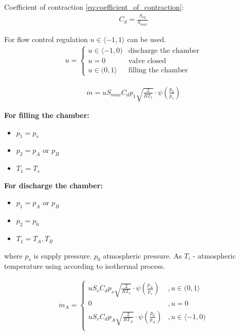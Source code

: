 \documentclass[class=article, crop=false]{standalone}
\begin{document}
Coefficient of contraction \ref{eq:coefficient_of_contraction}:
\begin{align}
    C_d = \frac{S_{eq}}{S_{max}}
    \label{eq:coefficient_of_contraction}
\end{align}

For flow control regulation $u \in \langle-1,1\rangle$ can be used.
\begin{align}
    u =
    \begin{cases}
        u \in \langle -1, 0) & \text{discharge the chamber} \\
        u = 0& \text{valve closed}  \\
        u \in (0, 1\rangle & \text{filling the chamber} 
    \end{cases}
\end{align} 

\begin{align}
    \dot{m} = u S_{max} C_d p_1 \sqrt{\frac{2}{RT_1}}
    \cdot \psi\left(\frac{p_2}{p_1}\right)
    \label{eq:flow}
\end{align}

\textbf{For filling the chamber:}
\begin{itemize}
\item $p_1 = p_s$ 
\item $p_2 = p_A \text{ or } p_B$
\item $T_1 = T_s$
\end{itemize}

\textbf{For discharge the chamber:}
\begin{itemize}
\item $p_1 = p_A \text{ or } p_B$
\item $p_2 = p_0$
\item $T_1 = T_A, T_B$
\end{itemize}

where $p_s$ is supply pressure. $p_0$ atmospheric pressure. As $T_i$ - 
atmospheric temperature using according to isothermal process.

\begin{align}
    \dot{m}_A =
    \begin{cases}
        u S_v C_d p_s \sqrt{\frac{2}{RT_s}}
        \cdot \psi\left(\frac{p_A}{p_s}\right)  &,   u \in (0, 1 \rangle \\
        0   &,  u = 0 \\
        u S_v C_d p_A \sqrt{\frac{2}{RT_A}}
        \cdot \psi\left(\frac{p_0}{p_A}\right)  &,   u \in \langle -1, 0) \\
    \end{cases}
\end{align}
\end{document}
